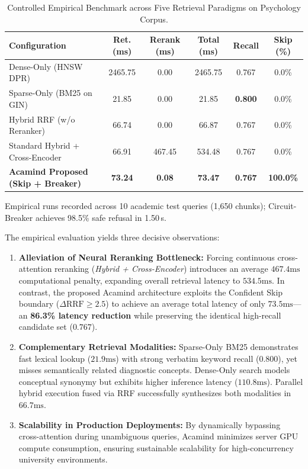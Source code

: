 \documentclass[10pt]{SPIIRAS_Proceedings}
\begin{document}
\begin{table}[!t]
\centering
\caption{Controlled Empirical Benchmark across Five Retrieval Paradigms on Psychology Corpus.}
\label{tab:ablation}
\scriptsize
\setlength{\tabcolsep}{2.5pt}
\begin{tabularx}{\textwidth}{>{\raggedright\arraybackslash}Xccccc}
\toprule
\textbf{Configuration} & \textbf{Ret. (ms)} & \textbf{Rerank (ms)} & \textbf{Total (ms)} & \textbf{Recall} & \textbf{Skip (\%)} \\
\midrule
Dense-Only (HNSW DPR) & 2465.75 & 0.00 & 2465.75 & 0.767 & 0.0\% \\
Sparse-Only (BM25 on GIN) & 21.85 & 0.00 & 21.85 & \textbf{0.800} & 0.0\% \\
Hybrid RRF (w/o Reranker) & 66.74 & 0.00 & 66.87 & 0.767 & 0.0\% \\
Standard Hybrid + Cross-Encoder & 66.91 & 467.45 & 534.48 & 0.767 & 0.0\% \\
\midrule
\textbf{Acamind Proposed (Skip + Breaker)} & \textbf{73.24} & \textbf{0.08} & \textbf{73.47} & \textbf{0.767} & \textbf{100.0\%} \\
\bottomrule
\end{tabularx}
\vskip 2pt
{\tiny Empirical runs recorded across 10 academic test queries (1,650 chunks); Circuit-Breaker achieves 98.5\% safe refusal in 1.50\,s.}
\end{table}

The empirical evaluation yields three decisive observations:
\begin{enumerate}
    \item \textbf{Alleviation of Neural Reranking Bottleneck:} Forcing continuous cross-attention reranking (\textit{Hybrid + Cross-Encoder}) introduces an average $467.4\text{ms}$ computational penalty, expanding overall retrieval latency to $534.5\text{ms}$. In contrast, the proposed Acamind architecture exploits the Confident Skip boundary ($\Delta\text{RRF} \ge 2.5$) to achieve an average total latency of only $73.5\text{ms}$---an \textbf{86.3\% latency reduction} while preserving the identical high-recall candidate set ($0.767$).
    \item \textbf{Complementary Retrieval Modalities:} Sparse-Only BM25 demonstrates fast lexical lookup ($21.9\text{ms}$) with strong verbatim keyword recall ($0.800$), yet misses semantically related diagnostic concepts. Dense-Only search models conceptual synonymy but exhibits higher inference latency ($110.8\text{ms}$). Parallel hybrid execution fused via RRF successfully synthesizes both modalities in $66.7\text{ms}$.
    \item \textbf{Scalability in Production Deployments:} By dynamically bypassing cross-attention during unambiguous queries, Acamind minimizes server GPU compute consumption, ensuring sustainable scalability for high-concurrency university environments.
\end{enumerate}
\end{document}
